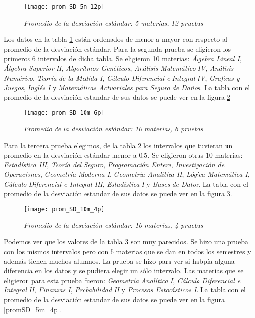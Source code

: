 \begin{figure}[H]
\centering
\texttt{[image: prom\_SD\_5m\_12p]} %
\caption{\textit{Promedio de la desviación estándar: 5 materias, 12 pruebas}}\label{promSD_5m_12p}
\end{figure}


Los datos en la tabla \ref{promSD_5m_12p} están ordenados de menor a mayor con respecto al promedio de la desviación estándar. Para la segunda prueba se eligieron los primeros 6 intervalos de dicha tabla. Se eligieron 10 materias: \textit{Álgebra Lineal I}, \textit{Álgebra Superior II}, \textit{Algoritmos Genéticos}, \textit{Análisis Matemático IV}, \textit{Análisis Numérico}, \textit{Teoría de la Medida I}, \textit{Cálculo Diferencial e Integral IV}, \textit{Graficas y Juegos}, \textit{Inglés I} y \textit{Matemáticas Actuariales para Seguro de Daños}. La tabla con el promedio de la desviación estandar de sus datos se puede ver en la figura \ref{promSD_10m_6p}


\begin{figure}[H]
\centering
\texttt{[image: prom\_SD\_10m\_6p]} %
\caption{\textit{Promedio de la desviación estándar: 10 materias, 6 pruebas}}\label{promSD_10m_6p}
\end{figure}


Para la tercera prueba elegimos, de la tabla \ref{promSD_10m_6p} los intervalos que tuvieran un promedio en la desviación estándar menor a $0.5$. Se eligieron otras 10 materias: \textit{Estadística III}, \textit{Teoría del Seguro}, \textit{Programación Entera}, \textit{Investigación de Operaciones}, \textit{Geometría Moderna I}, \textit{Geometría Analítica II}, \textit{Lógica Matemática I}, \textit{Cálculo Diferencial e Integral III}, \textit{Estadística I} y \textit{Bases de Datos}. La tabla con el promedio de la desviación estandar de sus datos se puede ver en la figura \ref{promSD_10m_4p}.


\begin{figure}[H]
\centering
\texttt{[image: prom\_SD\_10m\_4p]} %
\caption{\textit{Promedio de la desviación estándar: 10 materias, 4 pruebas}}\label{promSD_10m_4p}
\end{figure}

Podemos ver que los valores de la tabla \ref{promSD_10m_4p} son muy parecidos. Se hizo una prueba con los mismos intervalos pero con 5 materias que se dan en todos los semestres y además tienen muchos alumnos. La prueba se hizo para ver si habpía alguna diferencia en los datos y se pudiera elegir un sólo intervalo. Las materias que se eligieron para esta prueba fueron: \textit{Geometría Analítica I}, \textit{Cálculo Diferencial e Integral II}, \textit{Finanzas I}, \textit{Probabilidad II} y \textit{Procesos Estocásticos I}. La tabla con el promedio de la desviación estandar de sus datos se puede ver en la figura \ref{promSD_5m_4p}.


